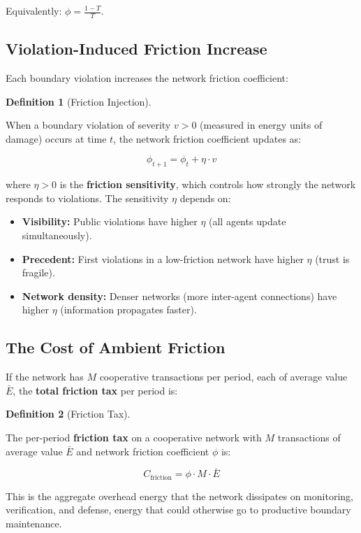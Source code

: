 \documentclass[11pt]{article}
\theoremstyle{plain}
\theoremstyle{definition}
\newtheorem{definition}{Definition}
\theoremstyle{remark}
\let\origsubsection\subsection
\renewcommand{\subsection}{\needspace{7\baselineskip}\origsubsection}
\begin{document}
Equivalently: \(\phi = \frac{1 - T}{T}\).

\subsection{Violation-Induced Friction
Increase}\label{violation-induced-friction-increase}

Each boundary violation increases the network friction coefficient:

\begin{definition}[Friction Injection]
\label{def-friction-injection}

When a boundary violation of severity $v > 0$ (measured in energy units of damage) occurs at time $t$, the network friction coefficient updates as:

$$\phi_{t+1} = \phi_t + \eta \cdot v$$

where $\eta > 0$ is the \textbf{friction sensitivity}, which controls how strongly the network responds to violations. The sensitivity $\eta$ depends on:
\begin{itemize}
\item \textbf{Visibility:} Public violations have higher $\eta$ (all agents update simultaneously).
\item \textbf{Precedent:} First violations in a low-friction network have higher $\eta$ (trust is fragile).
\item \textbf{Network density:} Denser networks (more inter-agent connections) have higher $\eta$ (information propagates faster).
\end{itemize}

\end{definition}

\subsection{The Cost of Ambient
Friction}\label{the-cost-of-ambient-friction}

If the network has \(M\) cooperative transactions per period, each of
average value \(\bar{E}\), the \textbf{total friction tax} per period
is:

\begin{definition}[Friction Tax]
\label{def-friction-tax}

The per-period \textbf{friction tax} on a cooperative network with $M$ transactions of average value $\bar{E}$ and network friction coefficient $\phi$ is:

$$C_{\text{friction}} = \phi \cdot M \cdot \bar{E}$$

This is the aggregate overhead energy that the network dissipates on monitoring, verification, and defense, energy that could otherwise go to productive boundary maintenance.
\end{definition}
\end{document}

